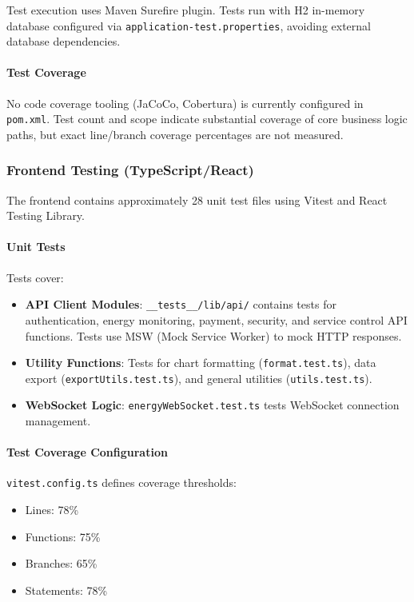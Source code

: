 Test execution uses Maven Surefire plugin. Tests run with H2 in-memory database configured via \texttt{application-test.properties}, avoiding external database dependencies.

\paragraph{Test Coverage}
No code coverage tooling (JaCoCo, Cobertura) is currently configured in \texttt{pom.xml}. Test count and scope indicate substantial coverage of core business logic paths, but exact line/branch coverage percentages are not measured.

\subsubsection{Frontend Testing (TypeScript/React)}
\label{subsubsec:integration-testing}

The frontend contains approximately 28 unit test files using Vitest and React Testing Library.

\paragraph{Unit Tests}
Tests cover:
\begin{itemize}
    \item \textbf{API Client Modules}: \texttt{\_\_tests\_\_/lib/api/} contains tests for authentication, energy monitoring, payment, security, and service control API functions. Tests use MSW (Mock Service Worker) to mock HTTP responses.
    \item \textbf{Utility Functions}: Tests for chart formatting (\texttt{format.test.ts}), data export (\texttt{exportUtils.test.ts}), and general utilities (\texttt{utils.test.ts}).
    \item \textbf{WebSocket Logic}: \texttt{energyWebSocket.test.ts} tests WebSocket connection management.
\end{itemize}

\paragraph{Test Coverage Configuration}
\texttt{vitest.config.ts} defines coverage thresholds:
\begin{itemize}
    \item Lines: 78\%
    \item Functions: 75\%
    \item Branches: 65\%
    \item Statements: 78\%
\end{itemize}

